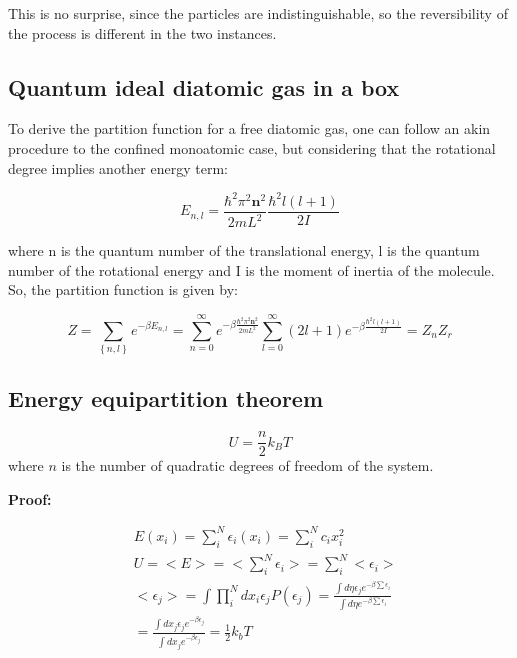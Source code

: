 \documentclass{article}
\begin{document}
This is no surprise, since the particles are indistinguishable, so the reversibility of the process is different in the two instances.

\subsection{Quantum ideal diatomic gas in a box}

To derive the partition function for a free diatomic gas, one can follow
an akin procedure to the confined monoatomic case, but considering that the rotational degree implies another energy term:

\begin{equation}
    E_{n,l}=\frac{\hbar^2\pi^2 \textbf{n}^2}{2mL^2}\frac{\hbar^2 l(l+1)}{2I}
\end{equation}

where n is the quantum number of the translational energy, l is the quantum number of the rotational energy and I is the moment of inertia of the molecule.
So, the partition function is given by:

\begin{equation}
    Z=\sum_{\left\{ n,l \right\}} e^{-\beta E_{n,l}}=\sum_{n=0}^\infty e^{-\beta\frac{\hbar^2\pi^2 \textbf{n}^2}{2mL^2}}\sum_{l=0}^{\infty}(2l+1)e^{-\beta\frac{\hbar^2 l(l+1)}{2I}}=Z_nZ_r
\end{equation}



\subsection{Energy equipartition theorem}

\begin{tcolorbox}[colframe=gray!50, colback=gray!10, coltitle=black, title=Energy Equipartition Theorem]

    \begin{equation}
        U=\frac{n}{2}k_BT
    \end{equation}
    where \( n \) is the number of quadratic degrees of freedom of the system.

\end{tcolorbox}

\textbf{Proof:}

\begin{equation}
    \begin{aligned}
         & E({x_i})=\sum_{i}^{N}\epsilon_i(x_i)=\sum_{i}^{N}c_ix_i^2                                                                                                 \\
         & U=<E>=<\sum_{i}^{N}\epsilon_i>=\sum_{i}^{N}<\epsilon_i>                                                                                                   \\
         & <\epsilon_j>=\int \prod_{i}^{N}dx_i\epsilon_jP(\epsilon_j)= \frac{\int d\eta \epsilon_je^{-\beta \sum \epsilon_i}}{\int d\eta e^{-\beta \sum \epsilon_i}} \\
         & = \frac{\int dx_j\epsilon_je^{-\beta \epsilon_j}}{\int dx_je^{-\beta \epsilon_j}}=\frac{1}{2}k_bT
    \end{aligned}
\end{equation}
\end{document}
